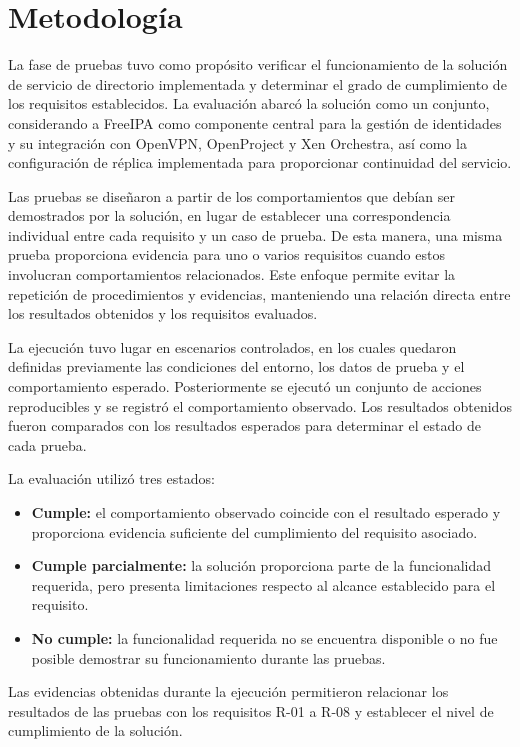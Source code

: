 \section{Metodología}
La fase de pruebas tuvo como propósito verificar el funcionamiento de la solución de servicio de directorio implementada y determinar el grado de cumplimiento de los requisitos establecidos. La evaluación abarcó la solución como un conjunto, considerando a FreeIPA como componente central para la gestión de identidades y su integración con OpenVPN, OpenProject y Xen Orchestra, así como la configuración de réplica implementada para proporcionar continuidad del servicio.

Las pruebas se diseñaron a partir de los comportamientos que debían ser demostrados por la solución, en lugar de establecer una correspondencia individual entre cada requisito y un caso de prueba. De esta manera, una misma prueba proporciona evidencia para uno o varios requisitos cuando estos involucran comportamientos relacionados. Este enfoque permite evitar la repetición de procedimientos y evidencias, manteniendo una relación directa entre los resultados obtenidos y los requisitos evaluados.

La ejecución tuvo lugar en escenarios controlados, en los cuales quedaron definidas previamente las condiciones del entorno, los datos de prueba y el comportamiento esperado. Posteriormente se ejecutó un conjunto de acciones reproducibles y se registró el comportamiento observado. Los resultados obtenidos fueron comparados con los resultados esperados para determinar el estado de cada prueba.

La evaluación utilizó tres estados:
\begin{itemize}
	\item \textbf{Cumple:} el comportamiento observado coincide con el resultado esperado y proporciona evidencia suficiente del cumplimiento del requisito asociado.
	\item \textbf{Cumple parcialmente:} la solución proporciona parte de la funcionalidad requerida, pero presenta limitaciones respecto al alcance establecido para el requisito.
	\item \textbf{No cumple:} la funcionalidad requerida no se encuentra disponible o no fue posible demostrar su funcionamiento durante las pruebas.
\end{itemize}

Las evidencias obtenidas durante la ejecución permitieron relacionar los resultados de las pruebas con los requisitos R-01 a R-08 y establecer el nivel de cumplimiento de la solución.

